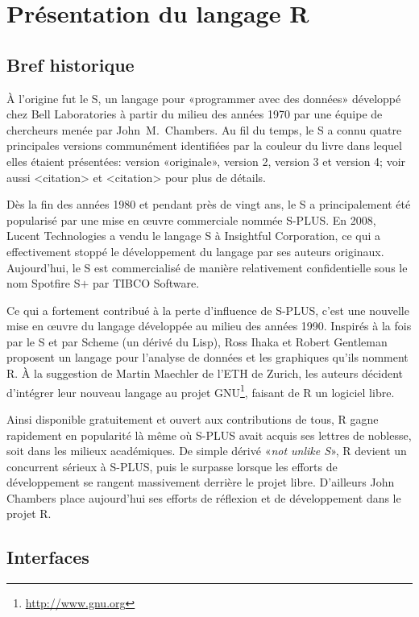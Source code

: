 \chapter{Présentation du langage R}
\label{chap:presentation}

\section{Bref historique}
\label{sec:presentation:historique}

À l'origine fut le S, un langage pour «programmer avec des données»
développé chez Bell Laboratories à partir du milieu des années 1970
par une équipe de chercheurs menée par John~M.\ Chambers. Au fil du
temps, le S a connu quatre principales versions communément
identifiées par la couleur du livre dans lequel elles étaient
présentées: %
version «originale», %
version 2, %
version 3 et %
version 4; %
voir aussi <citation> et <citation> pour plus de détails.

Dès la fin des années 1980 et pendant près de vingt ans, le S a
principalement été popularisé par une mise en {\oe}uvre commerciale
nommée S-PLUS. En 2008, Lucent Technologies a vendu le langage S à
Insightful Corporation, ce qui a effectivement stoppé le développement
du langage par ses auteurs originaux. Aujourd'hui, le S est
commercialisé de manière relativement confidentielle sous le nom
Spotfire S$+$ par TIBCO Software.

Ce qui a fortement contribué à la perte d'influence de S-PLUS, c'est
une nouvelle mise en {\oe}uvre du langage développée au milieu des
années 1990. Inspirés à la fois par le S et par Scheme (un dérivé du
Lisp), Ross Ihaka et Robert Gentleman proposent un langage pour
l'analyse de données et les graphiques qu'ils nomment R. À la
suggestion de Martin Maechler de l'ETH de Zurich, les auteurs décident
d'intégrer leur nouveau langage au projet GNU\footnote{%
  \url{http://www.gnu.org}}, %
faisant de R un logiciel libre.

Ainsi disponible gratuitement et ouvert aux contributions de tous,
R gagne rapidement en popularité là même où S-PLUS avait acquis ses
lettres de noblesse, soit dans les milieux académiques. De simple
dérivé «\emph{not unlike S}», R devient un concurrent sérieux à
S-PLUS, puis le surpasse lorsque les efforts de développement se
rangent massivement derrière le projet libre. D'ailleurs John Chambers
place aujourd'hui ses efforts de réflexion et de développement dans le
projet R.


\section{Interfaces}
\label{sec:presentation:interfaces}

